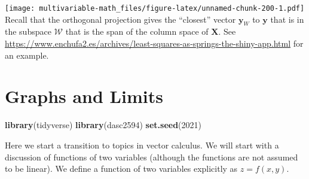 \documentclass[
]{book}
\newenvironment{Shaded}{\begin{snugshade}}{\end{snugshade}}
\newcommand{\CommentTok}[1]{\textcolor[rgb]{0.56,0.35,0.01}{\textit{#1}}}
\newcommand{\DataTypeTok}[1]{\textcolor[rgb]{0.13,0.29,0.53}{#1}}
\newcommand{\DecValTok}[1]{\textcolor[rgb]{0.00,0.00,0.81}{#1}}
\newcommand{\KeywordTok}[1]{\textcolor[rgb]{0.13,0.29,0.53}{\textbf{#1}}}
\newcommand{\NormalTok}[1]{#1}
\newcommand{\OperatorTok}[1]{\textcolor[rgb]{0.81,0.36,0.00}{\textbf{#1}}}
\newcommand{\StringTok}[1]{\textcolor[rgb]{0.31,0.60,0.02}{#1}}
\theoremstyle{definition}
\theoremstyle{definition}
\theoremstyle{definition}
\theoremstyle{definition}
\theoremstyle{remark}
\begin{document}
\begin{Shaded}
\end{Shaded}

\texttt{[image: multivariable-math\_files/figure-latex/unnamed-chunk-200-1.pdf]}
Recall that the orthogonal projection gives the ``closest'' vector \(\mathbf{y}_W\) to \(\mathbf{y}\) that is in the subspace \(\mathcal{W}\) that is the span of the column space of \(\mathbf{X}\). See \url{https://www.enchufa2.es/archives/least-squares-as-springs-the-shiny-app.html} for an example.

\hypertarget{graphs-and-limits}{%
\chapter{Graphs and Limits}\label{graphs-and-limits}}

\begin{Shaded}
\begin{Highlighting}[]
\KeywordTok{library}\NormalTok{(tidyverse)}
\KeywordTok{library}\NormalTok{(dasc2594)}
\KeywordTok{set.seed}\NormalTok{(}\DecValTok{2021}\NormalTok{)}
\end{Highlighting}
\end{Shaded}

Here we start a transition to topics in vector calculus. We will start with a discussion of functions of two variables (although the functions are not assumed to be linear). We define a function of two variables explicitly as \(z = f(x, y)\).
\end{document}
